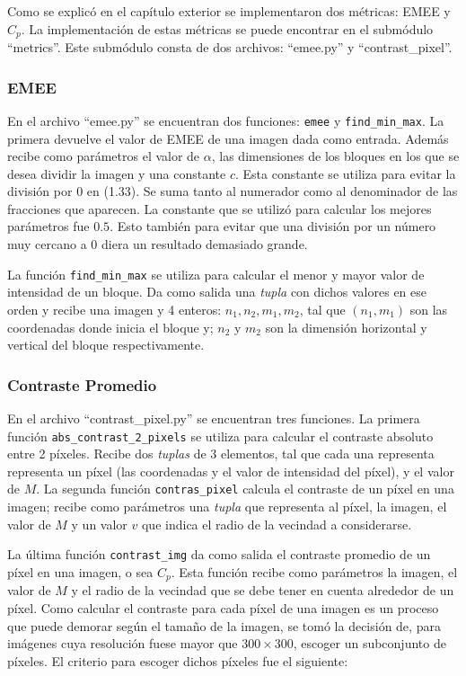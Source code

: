 Como se explic\'o en el cap\'itulo exterior se implementaron dos m\'etricas: EMEE y $C_p$. La implementaci\'on de estas m\'etricas se puede encontrar en el subm\'odulo ``metrics''. Este subm\'odulo consta de dos archivos: ``emee.py'' y ``contrast\_pixel''. 

\subsubsection{EMEE}
En el archivo ``emee.py'' se encuentran dos funciones: \verb|emee| y \verb|find_min_max|. La primera devuelve el valor de EMEE de una imagen dada como entrada. Adem\'as recibe como par\'ametros el valor de $\alpha$, las dimensiones de los bloques en los que se desea dividir la imagen y una constante $c$. Esta constante se utiliza para evitar la divisi\'on por $0$ en (1.33). Se suma tanto al numerador como al denominador de las fracciones que aparecen. La constante que se utiliz\'o para calcular los mejores par\'ametros fue $0.5$. Esto tambi\'en para evitar que una divisi\'on por un n\'umero muy cercano a 0 diera un resultado demasiado grande. 

La funci\'on \verb|find_min_max| se utiliza para calcular el menor y mayor valor de intensidad de un bloque. Da como salida una \textit{tupla} con dichos valores en ese orden y recibe una imagen y 4 enteros: $n_1,n_2,m_1,m_2$, tal que $(n_1,m_1)$ son las coordenadas donde inicia el bloque y; $n_2$ y $m_2$ son la dimensi\'on horizontal y vertical del bloque respectivamente.

\subsubsection{Contraste Promedio}
En el archivo ``contrast\_pixel.py'' se encuentran tres funciones. La primera funci\'on \verb|abs_contrast_2_pixels| se utiliza para calcular el contraste absoluto entre 2 p\'ixeles. Recibe dos \textit{tuplas} de 3 elementos, tal que cada una representa representa un p\'ixel (las coordenadas y el valor de intensidad del p\'ixel), y el valor de $M$.  La segunda funci\'on \verb|contras_pixel| calcula el contraste de un p\'ixel en una imagen; recibe como par\'ametros una \textit{tupla} que representa al p\'ixel, la imagen, el valor de $M$ y un valor $v$ que indica el radio de la vecindad a considerarse. 

La \'ultima funci\'on \verb|contrast_img| da como salida el contraste promedio de un p\'ixel en una imagen, o sea $C_p$. Esta funci\'on recibe como par\'ametros la imagen, el valor de $M$ y el radio de la vecindad que se debe tener en cuenta alrededor de un p\'ixel. Como calcular el contraste para cada p\'ixel de una imagen es un proceso que puede demorar seg\'un el tama\~no de la imagen, se tom\'o la decisi\'on de, para im\'agenes cuya resoluci\'on fuese mayor que $300\times300$, escoger un subconjunto de p\'ixeles. El criterio para escoger dichos p\'ixeles fue el siguiente:


